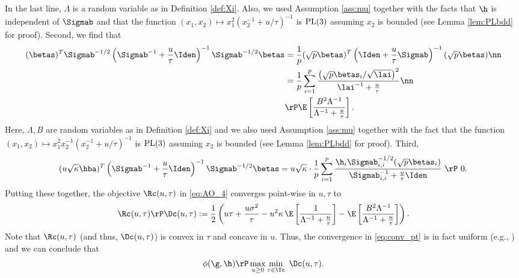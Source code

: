 In the last line, $\Lambda$ is a random variable as in Definition \ref{def:Xi}. {Also, we used Assumption \ref{ass:mu} together with the facts that $\h$ is independent of $\Sigmab$ and  that the function $(x_1,x_2)\mapsto x_1^2(x_2^{-1}+u/\tau)^{-1}$ is $\rm{PL}(3)$ assuming $x_2$ is bounded (see Lemma \ref{lem:PLbdd} for proof).}
%
 Second, we find that
\begin{align}
(\betas)^T\Sigmab^{-1/2}\left(\Sigmab^{-1}+\frac{u}{\tau}\Iden\right)^{-1}\Sigmab^{-1/2}\betas &= \frac{1}{p}(\sqrt{p}\betas)^T\left(\Iden+\frac{u}{\tau}\Sigmab\right)^{-1}(\sqrt{p}\betas) \nn\\
&= \frac{1}{p}\sum_{i=1}^{p}\frac{\left(\sqrt{p}\betas_i/\sqrt{\lai}\right)^2}{\lai^{-1}+\frac{u}{\tau}}\nn\\
&\rP \E\left[\frac{B^2\Lambda^{-1}}{\Lambda^{-1}+\frac{u}{\tau}}\right].
\end{align}
Here, $\Lambda,B$ are random variables as in Definition \ref{def:Xi} and {we also used Assumption \ref{ass:mu} together with the fact that the function $(x_1,x_2)\mapsto x_1^2x_2^{-1}(x_2^{-1}+u/\tau)^{-1}$ is $\rm{PL}(3)$ assuming $x_2$ is bounded (see Lemma \ref{lem:PLbdd} for proof).}
Third, 
\begin{align}
(u\sqrt{\kappa}\hba)^T\left(\Sigmab^{-1}+\frac{u}{\tau}\Iden\right)^{-1}\Sigmab^{-1/2}\betas = u\sqrt{\kappa} \cdot \frac{1}{p}\sum_{i=1}
^p \frac{\h_i\Sigmab_{i,i}^{-1/2}(\sqrt{p}\betas_i)}{\Sigmab_{i,i}^{-1}+\frac{u}{\tau}\Iden} ~\rP~ 0.
\end{align}
Putting these together, the objective $\Rc(u,\tau)$ in \eqref{eq:AO_4} converges point-wise in $u,\tau$ to
\begin{align}
\Rc(u,\tau)\rP\Dc(u,\tau) := \frac{1}{2}\left({u\tau} + \frac{u\sigma^2}{\tau} - u^2\kappa\,\E\left[ \frac{1}{\Lambda^{-1}+\frac{u}{\tau}} \right] - \E\left[\frac{B^2\Lambda^{-1}}{\Lambda^{-1}+\frac{u}{\tau}}\right] \right).\label{eq:conv_pt}
\end{align}
Note that $\Rc(u,\tau)$ (and thus, $\Dc(u,\tau)$) is convex in $\tau$ and concave in $u$. Thus, the convergence in \eqref{eq:conv_pt} is in fact uniform (e.g., \cite{AG1982}) and we can conclude that 
\begin{align}\label{eq:Dc0}
\phi(\g,\h) \rP \max_{u\geq 0}\min_{\tau\in\Tc}~ \Dc(u,\tau).
\end{align}
